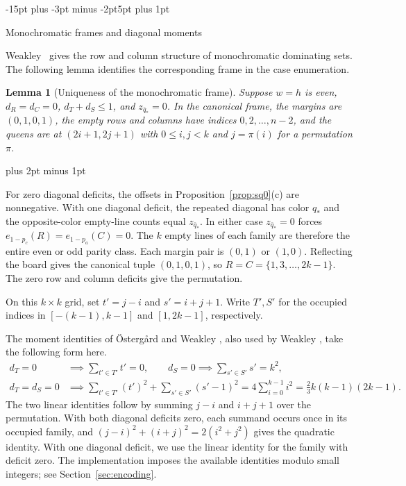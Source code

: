 \documentclass[11pt,a4paper]{article}
\makeatletter
\renewcommand{\subsection}{\@startsection{subsection}{2}{\z@}%
  {-15pt plus -3pt minus -2pt}{5pt plus 1pt}%
  {\normalfont\bfseries\raggedright}}
\renewenvironment{proof}[1][\proofname]{%
  \par\pushQED{\qed}\normalfont
  \topsep8pt plus 2pt minus 1pt\relax
  \trivlist\item[\hskip\labelsep\itshape #1\@addpunct{.}]\ignorespaces
}{\popQED\endtrivlist\@endpefalse}
\theoremstyle{result}
\newtheorem{lemma}[theorem]{Lemma}
\theoremstyle{definition}
\theoremstyle{remark}
\makeatother
\begin{document}
\subsection{Monochromatic frames and diagonal moments}\label{sec:mono}

Weakley~\cite[Proposition~13]{Weakley2022} gives the row and column
structure of monochromatic dominating sets. The following lemma
identifies the corresponding frame in the case enumeration.

\begin{lemma}[Uniqueness of the monochromatic frame]\label{lem:mono}
Suppose $w=h$ is even, $d_R=d_C=0$, $d_T+d_S\le1$, and
$z_{\bar q_*}=0$. In the canonical frame, the margins are
$(0,1,0,1)$, the empty rows and columns have indices
$0,2,\ldots,n-2$, and the queens are at $(2i+1,2j+1)$ with
$0\le i,j<k$ and $j=\pi(i)$ for a permutation $\pi$.
\end{lemma}

\begin{proof}
For zero diagonal deficits, the offsets in
Proposition~\ref{prop:sq0}(c) are nonnegative. With one diagonal
deficit, the repeated diagonal has color $q_*$ and the
opposite-color empty-line counts equal $z_{\bar q_*}$. In either
case $z_{\bar q_*}=0$ forces $e_{1-p_c}(R)=e_{1-p_a}(C)=0$.
The $k$ empty lines of each family are therefore the entire even
or odd parity class. Each margin pair is $(0,1)$ or $(1,0)$.
Reflecting the board gives the canonical tuple $(0,1,0,1)$, so
$R=C=\{1,3,\ldots,2k-1\}$. The zero row and column deficits give
the permutation.
\end{proof}

On this $k\times k$ grid, set $t'=j-i$ and $s'=i+j+1$. Write
$T',S'$ for the occupied indices in $[-(k-1),k-1]$ and $[1,2k-1]$,
respectively.

The moment identities of \"Osterg\aa rd and Weakley
\cite[Theorem~4 and Eq.~(3)]{OW2001}, also used by Weakley
\cite[Eqs.~(1)--(2)]{Weakley2022}, take the following form here.
\begin{align*}
  d_T = 0 &\implies \sum_{t' \in T'} t' = 0, \qquad
  d_S = 0 \implies \sum_{s' \in S'} s' = k^2, \\
  d_T = d_S = 0 &\implies \sum_{t' \in T'} (t')^2 + \sum_{s' \in S'} (s' - 1)^2 = 4 \sum_{i=0}^{k-1} i^2 = \frac{2}{3}k(k-1)(2k-1).
\end{align*}
The two linear identities follow by summing $j-i$ and $i+j+1$
over the permutation. With both diagonal deficits zero, each summand
occurs once in its occupied family, and
$(j-i)^2+(i+j)^2=2(i^2+j^2)$ gives the quadratic identity. With one
diagonal deficit, we use the linear identity for the family with
deficit zero. The implementation imposes the available identities
modulo small integers; see Section~\ref{sec:encoding}.
\end{document}
